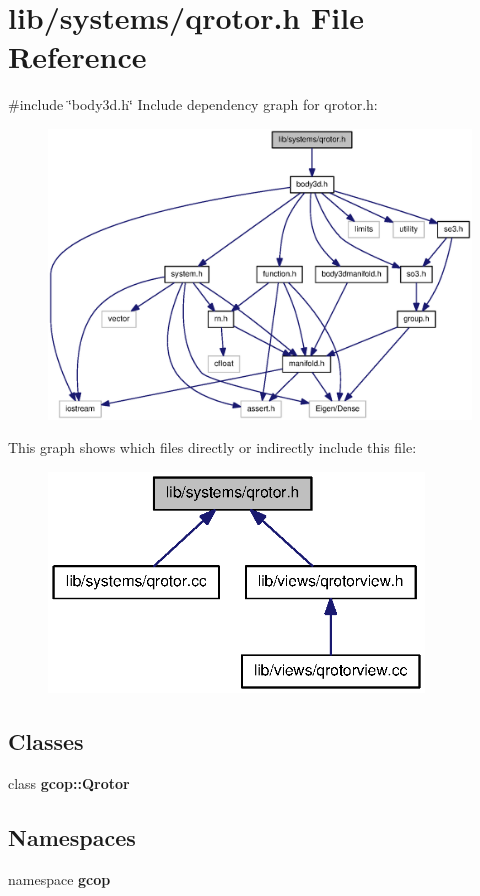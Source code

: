 \section{lib/systems/qrotor.h \-File \-Reference}
\label{qrotor_8h}
{\ttfamily \#include \char`\"{}body3d.\-h\char`\"{}}\*
\-Include dependency graph for qrotor.\-h\-:\nopagebreak
\begin{figure}[H]
\begin{center}
\leavevmode
\includegraphics[width=350pt]{qrotor_8h__incl}
\end{center}
\end{figure}
\-This graph shows which files directly or indirectly include this file\-:\nopagebreak
\begin{figure}[H]
\begin{center}
\leavevmode
\includegraphics[width=283pt]{qrotor_8h__dep__incl}
\end{center}
\end{figure}
\subsection*{\-Classes}
\begin{DoxyCompactItemize}
\item 
class {\bf gcop\-::\-Qrotor}
\end{DoxyCompactItemize}
\subsection*{\-Namespaces}
\begin{DoxyCompactItemize}
\item 
namespace {\bf gcop}
\end{DoxyCompactItemize}
